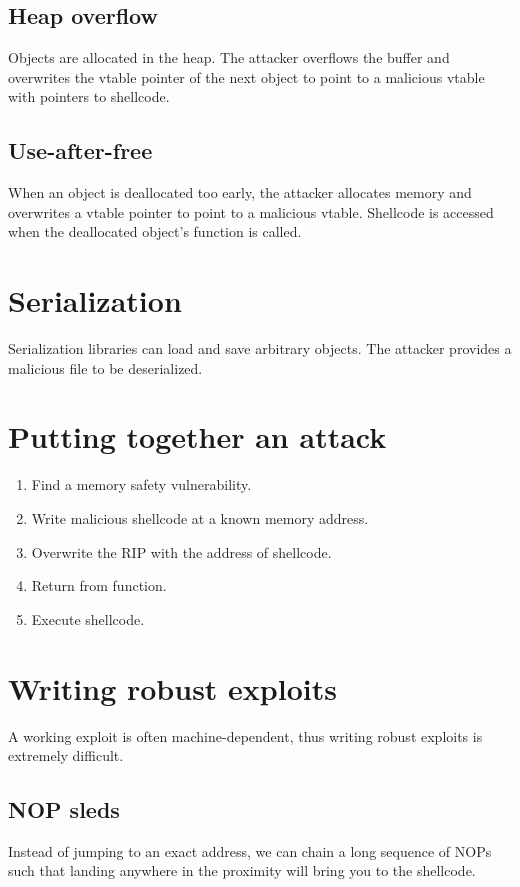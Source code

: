 \subsection{Heap overflow}
Objects are allocated in the heap. The attacker overflows the buffer and overwrites the vtable pointer of the next object to point to a malicious vtable with pointers to shellcode.

\subsection{Use-after-free}
When an object is deallocated too early, the attacker allocates memory and overwrites a vtable pointer to point to a malicious vtable. Shellcode is accessed when the deallocated object's function is called.

\section{Serialization}
Serialization libraries can load and save arbitrary objects. The attacker provides a malicious file to be deserialized.

\section{Putting together an attack}
\begin{enumerate}
    \item Find a memory safety vulnerability.
    \item Write malicious shellcode at a known memory address.
    \item Overwrite the RIP with the address of shellcode.
    \item Return from function.
    \item Execute shellcode.
\end{enumerate}

\section{Writing robust exploits}
A working exploit is often machine-dependent, thus writing robust exploits is extremely difficult.

\subsection{NOP sleds}
Instead of jumping to an exact address, we can chain a long sequence of NOPs such that landing anywhere in the proximity will bring you to the shellcode.